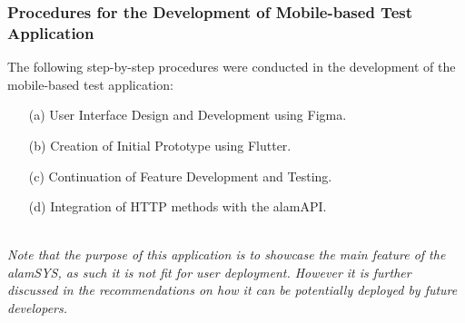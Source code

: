 \subsubsection{Procedures for the Development of Mobile-based Test Application}
\label{subsubsec:proc_mobdev}
The following step-by-step procedures were conducted in the development
of the mobile-based test application:
\begin{itemize}
    \item[(a)] User Interface Design and Development using Figma.
    \item[(b)] Creation of Initial Prototype using Flutter.
    \item[(c)] Continuation of Feature Development and Testing.
    \item[(d)] Integration of HTTP methods with the alamAPI.
\end{itemize}
\hfill \\

\textit{Note that the purpose of this application is to showcase the main feature of
the alamSYS, as such it is not fit for user deployment. However it is further discussed
in the recommendations on how it can be potentially deployed by future developers.}

